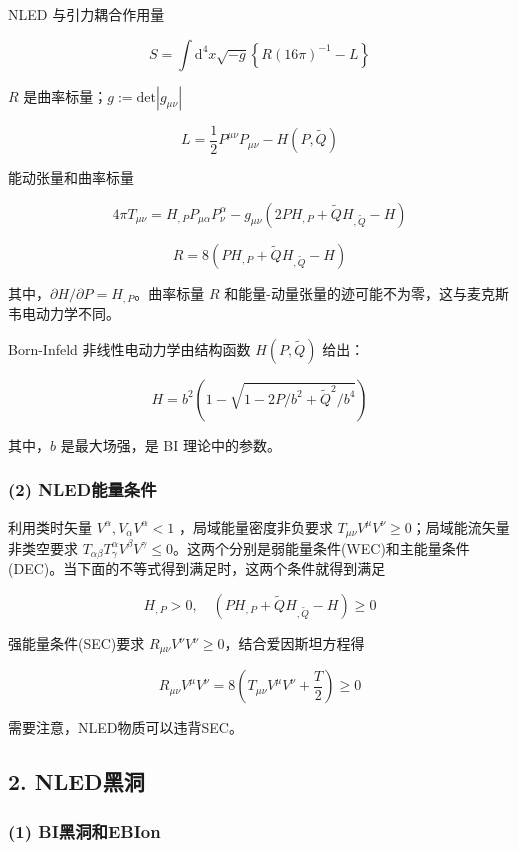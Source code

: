 \documentclass[aps,prl,preprint,groupedaddress,showkeys]{revtex4-2}
\begin{document}
NLED 与引力耦合作用量

$$
S
=\int \mathrm{d}^4 x\sqrt{-g} \left\{R(16\pi)^{-1}-L \right\}
$$

$R $ 是曲率标量；$g:=\mathrm{det}\left|g_{\mu\nu} \right| $

$$
L
=\frac{1 }{2 } P^{\mu\nu}P_{\mu\nu} - H\left(P,\tilde{Q} \right)
$$

能动张量和曲率标量

$$
4\pi T_{\mu\nu}
=H_{,P} P_{\mu\alpha} P_\nu^\alpha - g_{\mu\nu}\left(2P H_{,P} + \tilde{Q} H_{,\tilde{Q}} - H \right)
$$

$$
R
=8\left(P H_{,P} + \tilde{Q} H_{,\tilde{Q}} - H \right) 
$$

其中，$\partial H/\partial P = H_{,P} $。曲率标量 $R$ 和能量-动量张量的迹可能不为零，这与麦克斯韦电动力学不同。

Born-Infeld 非线性电动力学由结构函数 $H(P,\tilde{Q}) $ 给出：

$$
H = b^2\left(1-\sqrt{1-2P/b^2+\tilde{Q}^2/b^4} \right) 
$$

其中，$b $ 是最大场强，是 BI 理论中的参数。

\subsubsection{(2) NLED能量条件}

利用类时矢量 $V^\alpha,V_\alpha V^\alpha<1 $ ，局域能量密度非负要求 $T_{\mu\nu}V^\mu V^\nu\geq 0 $；局域能流矢量非类空要求 $T_{\alpha\beta}T_\gamma^\alpha V^\beta V^\gamma\leq 0 $。这两个分别是弱能量条件(WEC)和主能量条件(DEC)。当下面的不等式得到满足时，这两个条件就得到满足

$$
H_{,P}>0,\quad
\left(P H_{,P} + \tilde{Q} H_{,\tilde{Q}} - H \right) \geq 0
$$

强能量条件(SEC)要求 $R_{\mu\nu}V^\nu V^\nu\geq 0 $，结合爱因斯坦方程得

$$
R_{\mu\nu}V^\mu V^\nu 
=8\left(T_{\mu\nu} V^\mu V^\nu + \frac{T }{2 }  \right) \geq 0
$$

需要注意，NLED物质可以违背SEC。

\subsection{2. NLED黑洞}

\subsubsection{(1) BI黑洞和EBIon}
\end{document}
